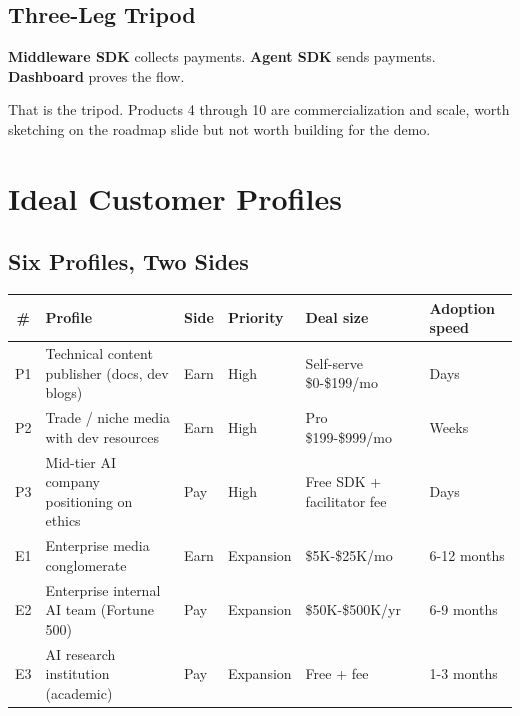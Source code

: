 \documentclass[11pt,a4paper]{article}
\newcommand{\iconCheck}{\textcolor{tollgategreen}{\faCheckCircle}}
\begin{document}
\subsection{Three-Leg Tripod}

\begin{highlightbox}[title={\iconCheck~ What we build in five days}]
\textbf{Middleware SDK} collects payments. \textbf{Agent SDK} sends payments. \textbf{Dashboard} proves the flow.

That is the tripod. Products 4 through 10 are commercialization and scale, worth sketching on the roadmap slide but not worth building for the demo.
\end{highlightbox}

\newpage

\section{Ideal Customer Profiles}

\subsection{Six Profiles, Two Sides}

\begin{table}[H]
\centering
\footnotesize
\begin{tabularx}{\textwidth}{@{} c l l l l X @{}}
\toprule
\textbf{\#} & \textbf{Profile} & \textbf{Side} & \textbf{Priority} & \textbf{Deal size} & \textbf{Adoption speed} \\
\midrule
P1 & Technical content publisher (docs, dev blogs) & Earn & High & Self-serve \$0-\$199/mo & Days \\
P2 & Trade / niche media with dev resources & Earn & High & Pro \$199-\$999/mo & Weeks \\
P3 & Mid-tier AI company positioning on ethics & Pay & High & Free SDK + facilitator fee & Days \\
E1 & Enterprise media conglomerate & Earn & Expansion & \$5K-\$25K/mo & 6-12 months \\
E2 & Enterprise internal AI team (Fortune 500) & Pay & Expansion & \$50K-\$500K/yr & 6-9 months \\
E3 & AI research institution (academic) & Pay & Expansion & Free + fee & 1-3 months \\
\bottomrule
\end{tabularx}
\end{table}
\end{document}

